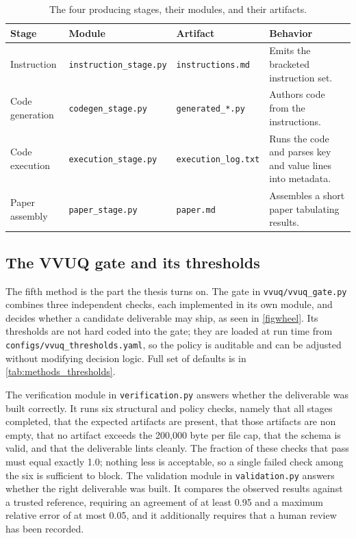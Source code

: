 \begin{table}[H]
\caption{The four producing stages, their modules, and their artifacts.}
\label{tab:methods_stages}
\centering
\begin{tabularx}{\textwidth}{L{2.7cm} L{3.6cm} L{3.0cm} >{\raggedright\arraybackslash}X}
\toprule
\textbf{Stage} & \textbf{Module} & \textbf{Artifact} & \textbf{Behavior} \\
\midrule
  Instruction & \texttt{instruction\_stage.py} & \texttt{instructions.md} & Emits the bracketed instruction set. \\
  Code generation & \texttt{codegen\_stage.py} & \texttt{generated\_*.py} & Authors code from the instructions. \\
  Code execution & \texttt{execution\_stage.py} & \texttt{execution\_log.txt} & Runs the code and parses key and value lines into metadata. \\
  Paper assembly & \texttt{paper\_stage.py} & \texttt{paper.md} & Assembles a short paper tabulating results. \\
\bottomrule
\end{tabularx}
\end{table}

\subsection{The VVUQ gate and its thresholds}

The fifth method is the part the thesis turns on. The gate in
\texttt{vvuq/vvuq\_gate.py} combines three independent checks, each implemented in
its own module, and decides whether a candidate deliverable may ship, as seen in \autoref{figwheel}. Its
thresholds are not hard coded into the gate; they are loaded at run time from
\texttt{configs/vvuq\_thresholds.yaml}, so the policy is auditable and can be
adjusted without modifying decision logic. Full set of defaults is in \autoref{tab:methods_thresholds}.

The verification module in \texttt{verification.py} answers whether the
deliverable was built correctly. It runs six structural and policy checks, namely
that all stages completed, that the expected artifacts are present, that those
artifacts are non empty, that no artifact exceeds the 200{,}000 byte per file
cap, that the schema is valid, and that the deliverable lints cleanly. The
fraction of these checks that pass must equal exactly 1.0; nothing less is
acceptable, so a single failed check among the six is sufficient to block. The
validation module in \texttt{validation.py} answers whether the right deliverable
was built. It compares the observed results against a trusted reference,
requiring an agreement of at least 0.95 and a maximum relative error of at most
0.05, and it additionally requires that a human review has been recorded. 

